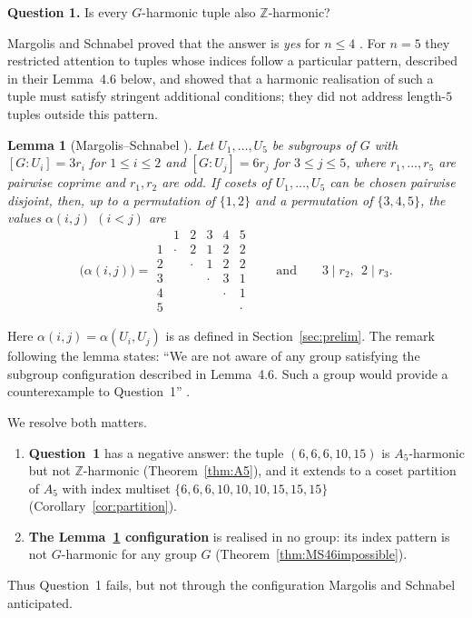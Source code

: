 \documentclass[12pt]{article}
\newtheorem{lemma}[theorem]{Lemma}
\theoremstyle{remark}
\newcommand{\Z}{\mathbb{Z}}
\begin{document}
\medskip
\noindent\textbf{Question 1.} Is every $G$-harmonic tuple also $\Z$-harmonic?
\medskip

Margolis and Schnabel proved that the answer is \emph{yes} for $n \le 4$ \cite[Theorem~B]{MargolisSchnabel}. For $n=5$ they restricted attention to tuples whose indices follow a particular pattern, described in their Lemma~4.6 below, and showed that a harmonic realisation of such a tuple must satisfy stringent additional conditions; they did not address length-$5$ tuples outside this pattern.

\begin{lemma}[Margolis--Schnabel {\cite[Lemma~4.6]{MargolisSchnabel}}]\label{lem:MS46}
Let $U_1,\ldots,U_5$ be subgroups of $G$ with $[G:U_i] = 3r_i$ for $1 \le i \le 2$ and $[G:U_j] = 6r_j$ for $3 \le j \le 5$, where $r_1,\ldots,r_5$ are pairwise coprime and $r_1,r_2$ are odd. If cosets of $U_1,\ldots,U_5$ can be chosen pairwise disjoint, then, up to a permutation of $\{1,2\}$ and a permutation of $\{3,4,5\}$, the values $\alpha(i,j)$ $(i<j)$ are
\[
\bigl(\alpha(i,j)\bigr)=
\begin{array}{c|ccccc}
 & 1 & 2 & 3 & 4 & 5\\\hline
1 & \cdot & 2 & 1 & 2 & 2\\
2 & & \cdot & 1 & 2 & 2\\
3 & & & \cdot & 3 & 1\\
4 & & & & \cdot & 1\\
5 & & & & & \cdot
\end{array}
\qquad\text{and}\qquad 3\mid r_2,\ \ 2\mid r_3.
\]
\end{lemma}

Here $\alpha(i,j)=\alpha(U_i,U_j)$ is as defined in Section~\ref{sec:prelim}. The remark following the lemma states: ``We are not aware of any group satisfying the subgroup configuration described in Lemma~4.6. Such a group would provide a counterexample to Question~1'' \cite[p.~15]{MargolisSchnabel}.

We resolve both matters.
\begin{enumerate}
\item \textbf{Question~1} has a negative answer: the tuple $(6,6,6,10,15)$ is $A_5$-harmonic but not $\Z$-harmonic (Theorem~\ref{thm:A5}), and it extends to a coset partition of $A_5$ with index multiset $\{6,6,6,10,10,10,15,15,15\}$ (Corollary~\ref{cor:partition}).
\item \textbf{The Lemma~\ref{lem:MS46} configuration} is realised in no group: its index pattern is not $G$-harmonic for any group $G$ (Theorem~\ref{thm:MS46impossible}).
\end{enumerate}
Thus Question~1 fails, but not through the configuration Margolis and Schnabel anticipated.
\end{document}
